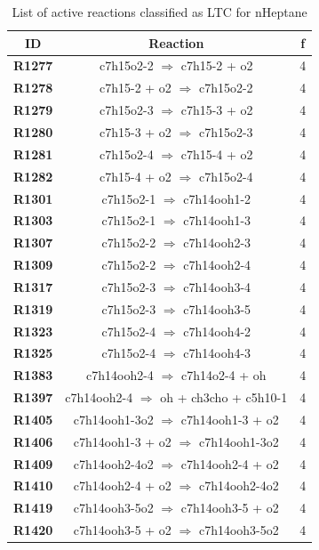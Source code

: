 \begin{table}[!ht]
\centering
\caption{List of active reactions classified as LTC for nHeptane}
\label{table:nHeptane_LTC}
\begin{tabular}{ccc}
\hline
\textbf{ID} & \textbf{Reaction} & \textbf{f} \\
\hline
\textbf{R1277} & c7h15o2-2 $\Rightarrow$ c7h15-2 + o2 & 4 \\
\textbf{R1278} & c7h15-2 + o2 $\Rightarrow$ c7h15o2-2 & 4 \\
\textbf{R1279} & c7h15o2-3 $\Rightarrow$ c7h15-3 + o2 & 4 \\
\textbf{R1280} & c7h15-3 + o2 $\Rightarrow$ c7h15o2-3 & 4 \\
\textbf{R1281} & c7h15o2-4 $\Rightarrow$ c7h15-4 + o2 & 4 \\
\textbf{R1282} & c7h15-4 + o2 $\Rightarrow$ c7h15o2-4 & 4 \\
\textbf{R1301} & c7h15o2-1 $\Rightarrow$ c7h14ooh1-2 & 4 \\
\textbf{R1303} & c7h15o2-1 $\Rightarrow$ c7h14ooh1-3 & 4 \\
\textbf{R1307} & c7h15o2-2 $\Rightarrow$ c7h14ooh2-3 & 4 \\
\textbf{R1309} & c7h15o2-2 $\Rightarrow$ c7h14ooh2-4 & 4 \\
\textbf{R1317} & c7h15o2-3 $\Rightarrow$ c7h14ooh3-4 & 4 \\
\textbf{R1319} & c7h15o2-3 $\Rightarrow$ c7h14ooh3-5 & 4 \\
\textbf{R1323} & c7h15o2-4 $\Rightarrow$ c7h14ooh4-2 & 4 \\
\textbf{R1325} & c7h15o2-4 $\Rightarrow$ c7h14ooh4-3 & 4 \\
\textbf{R1383} & c7h14ooh2-4 $\Rightarrow$ c7h14o2-4 + oh & 4 \\
\textbf{R1397} & c7h14ooh2-4 $\Rightarrow$ oh + ch3cho + c5h10-1 & 4 \\
\textbf{R1405} & c7h14ooh1-3o2 $\Rightarrow$ c7h14ooh1-3 + o2 & 4 \\
\textbf{R1406} & c7h14ooh1-3 + o2 $\Rightarrow$ c7h14ooh1-3o2 & 4 \\
\textbf{R1409} & c7h14ooh2-4o2 $\Rightarrow$ c7h14ooh2-4 + o2 & 4 \\
\textbf{R1410} & c7h14ooh2-4 + o2 $\Rightarrow$ c7h14ooh2-4o2 & 4 \\
\textbf{R1419} & c7h14ooh3-5o2 $\Rightarrow$ c7h14ooh3-5 + o2 & 4 \\
\textbf{R1420} & c7h14ooh3-5 + o2 $\Rightarrow$ c7h14ooh3-5o2 & 4 \\

\end{tabular}
\end{table}
